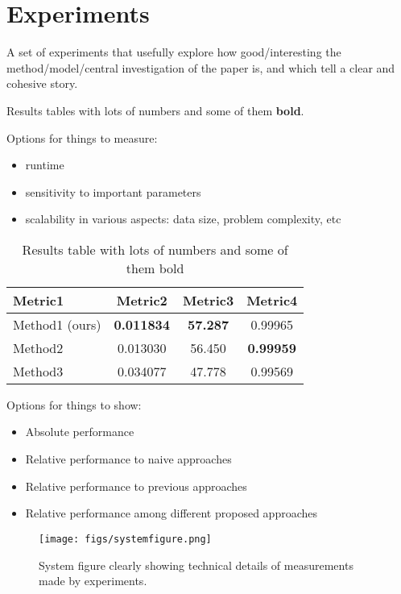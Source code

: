 \section{Experiments}
\label{experiments}

A set of experiments that usefully explore how good/interesting the method/model/central investigation of the paper is, and which tell a clear and cohesive story.

Results tables with lots of numbers and some of them \textbf{bold}.

Options for things to measure:
\begin{itemize}
    \item runtime
    \item sensitivity to important parameters
    \item scalability in various aspects: data size, problem complexity, etc
\end{itemize}

\begin{table}[ht]
\label{table:reconstruction_table}
\centering
\begin{tabular}{lccc}
\hline
Metric1 & Metric2 & Metric3 & Metric4 \\
\hline
Method1 (ours) & \textbf{0.011834} & \textbf{57.287} & 0.99965 \\
Method2 & 0.013030 & 56.450 & \textbf{0.99959} \\
Method3 & 0.034077 & 47.778 & 0.99569 \\
\end{tabular}
\caption{Results table with lots of numbers and some of them bold}
\end{table}

Options for things to show:
\begin{itemize}
    \item Absolute performance
    \item Relative performance to naive approaches
    \item Relative performance to previous approaches
    \item Relative performance among different proposed approaches
\end{itemize}

\begin{figure}[h]
\centering
\begin{minipage}{0.3\linewidth}
    \centering
    \texttt{[image: figs/systemfigure.png]} 
\end{minipage}
\caption{System figure clearly showing technical details of measurements made by experiments.}
\label{fig:system}
\end{figure}